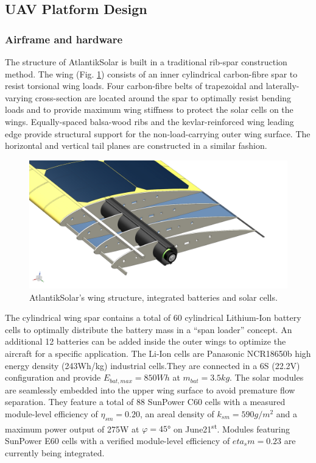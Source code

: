 \subsection{UAV Platform Design}
\subsubsection{Airframe and hardware}

The structure of AtlantikSolar is built in a traditional rib-spar construction method. The wing (Fig. \ref{fig:CAD_AtlantikSolarStructure}) consists of an inner cylindrical carbon-fibre spar to resist torsional wing loads. Four carbon-fibre belts of trapezoidal and laterally-varying cross-section are located around the spar to optimally resist bending loads and to provide maximum wing stiffness to protect the solar cells on the wings. Equally-spaced balsa-wood ribs and the kevlar-reinforced wing leading edge provide structural support for the non-load-carrying outer wing surface. The horizontal and vertical tail planes are constructed in a similar fashion.

\begin{figure}[tb]
    \centering
    \includegraphics[width=\linewidth]{images/7_CAD_AtlantikSolarStructure}
    \caption{AtlantikSolar's wing structure, integrated batteries and solar cells.}
    \label{fig:CAD_AtlantikSolarStructure}
\end{figure}

The cylindrical wing spar contains a total of 60 cylindrical Lithium-Ion battery cells to optimally distribute the battery mass in a ``span loader'' concept. An additional 12 batteries can be added inside the outer wings to optimize the aircraft for a specific application. The Li-Ion cells are Panasonic NCR18650b high energy density (243Wh/kg) industrial cells.They are connected in a 6S (22.2V) configuration and provide $E_{bat,max}=850Wh$ at $m_{bat}=3.5kg$. The solar modules are seamlessly embedded into the upper wing surface to avoid premature flow separation. They feature a total of 88 SunPower C60 cells with a measured module-level efficiency of $\eta_{sm}=0.20$, an areal density of $k_{sm}=590g/m^2$ and a maximum power output of 275W at $\varphi=45°$ on June21\textsuperscript{st}. Modules featuring SunPower E60 cells with a verified module-level efficiency of $eta_sm=0.23$ are currently being integrated.

